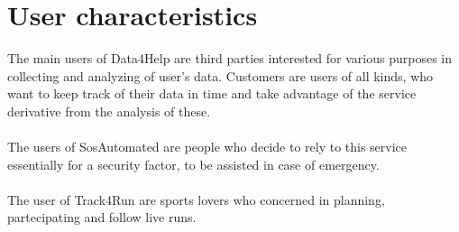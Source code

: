 \section{User characteristics}
The main users of Data4Help are third parties interested for various purposes in collecting and analyzing of user's data.
Customers are users of all kinds, who want to keep track of their data in time and take advantage of the service derivative from the analysis of these.
\\ \\The users of SosAutomated are people who decide to rely to this service essentially for a security factor, to be assisted in case of emergency.
\\ \\The user of Track4Run are sports lovers who concerned in planning, partecipating and follow live runs. 
 


